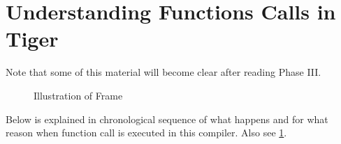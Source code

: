 \section{Understanding Functions Calls in Tiger}

\begin{tcolorbox}
  Note that some of this material will become clear after reading Phase III.
\end{tcolorbox}

\begin{figure}
\centering
{}
\caption{Illustration of Frame}
\label{fig:myframe}
\end{figure}

Below is explained in chronological sequence of what happens and for
what reason when function call is executed in this compiler. Also see \ref{fig:myframe}.

